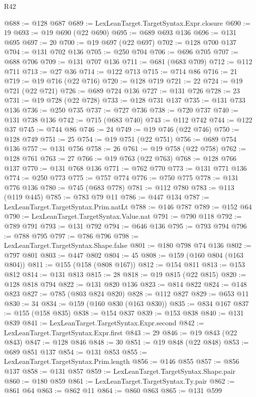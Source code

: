 \begin{lexlean}{R42}
\begin{coremodule}
@688 := @128 @687
@689 := LexLeanTarget.TargetSyntax.Expr.closure
@690 := 19
@693 := @19 @690 (@22 @690)
@695 := @689 @693 @136
@696 := @131 @695
@697 := 20
@700 := @19 @697 (@22 @697)
@702 := @128 @700 @137
@704 := @131 @702 @136
@705 := @250 @704
@706 := @696 @705
@707 := @688 @706
@709 := @131 @707 @136
@711 := @681 (@683 @709)
@712 := @112 @711
@713 := @27 @36
@714 := @122 @713
@715 := @714 @86
@716 := 21
@719 := @19 @716 (@22 @716)
@720 := @128 @719
@721 := 22
@724 := @19 @721 (@22 @721)
@726 := @689 @724 @136
@727 := @131 @726
@728 := 23
@731 := @19 @728 (@22 @728)
@733 := @128 @731 @137
@735 := @131 @733 @136
@736 := @250 @735
@737 := @727 @736
@738 := @720 @737
@740 := @131 @738 @136
@742 := @715 (@683 @740)
@743 := @112 @742
@744 := @122 @37
@745 := @744 @86
@746 := 24
@749 := @19 @746 (@22 @746)
@750 := @128 @749
@751 := 25
@754 := @19 @751 (@22 @751)
@756 := @689 @754 @136
@757 := @131 @756
@758 := 26
@761 := @19 @758 (@22 @758)
@762 := @128 @761
@763 := 27
@766 := @19 @763 (@22 @763)
@768 := @128 @766 @137
@770 := @131 @768 @136
@771 := @762 @770
@773 := @131 @771 @136
@774 := @250 @773
@775 := @757 @774
@776 := @750 @775
@778 := @131 @776 @136
@780 := @745 (@683 @778)
@781 := @112 @780
@783 := @113 (@119 @445)
@785 := @783 @79 @11
@786 := @447 @134
@787 := LexLeanTarget.TargetSyntax.Prim.natLt
@788 := @146 @787
@789 := @152 @64
@790 := LexLeanTarget.TargetSyntax.Value.nat
@791 := @790 @118
@792 := @789 @791
@793 := @131 @792
@794 := @646 @136
@795 := @793 @794
@796 := @788 @795
@797 := @786 @796
@798 := LexLeanTarget.TargetSyntax.Shape.false
@801 := @180 @798 @74 @136
@802 := @797 @801
@803 := @447 @802
@804 := 45
@808 := @159 (@160 @804 (@163 @804))
@811 := @155 (@158 (@808 @167))
@812 := @154 @811
@813 := @153 @812
@814 := @131 @813
@815 := 28
@818 := @19 @815 (@22 @815)
@820 := @128 @818 @794
@822 := @131 @820 @136
@823 := @814 @822
@824 := @148 @823
@827 := @785 (@803 @824 @820)
@828 := @112 @827
@829 := @653 @11
@830 := 34
@834 := @159 (@160 @830 (@163 @830))
@835 := @834 @167
@837 := @155 (@158 @835)
@838 := @154 @837
@839 := @153 @838
@840 := @131 @839
@841 := LexLeanTarget.TargetSyntax.Expr.second
@842 := LexLeanTarget.TargetSyntax.Expr.first
@843 := 29
@846 := @19 @843 (@22 @843)
@847 := @128 @846
@848 := 30
@851 := @19 @848 (@22 @848)
@853 := @689 @851 @137
@854 := @131 @853
@855 := LexLeanTarget.TargetSyntax.Prim.length
@856 := @146 @855
@857 := @856 @137
@858 := @131 @857
@859 := LexLeanTarget.TargetSyntax.Shape.pair
@860 := @180 @859
@861 := LexLeanTarget.TargetSyntax.Ty.pair
@862 := @861 @64
@863 := @862 @11
@864 := @860 @863
@865 := @131 @599

\end{coremodule}
\end{lexlean}
